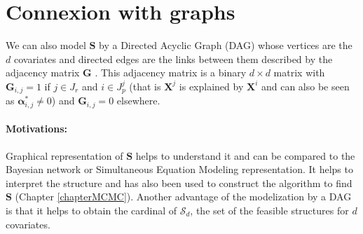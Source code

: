 \documentclass[12pt,a4paper]{report}
\begin{document}
\section{Connexion with graphs}\label{sectiongraph}
	We can also model $\boldsymbol{S}$ by a Directed Acyclic Graph (DAG) whose vertices are the $d$ covariates and directed edges are the links  between them described by the adjacency matrix $\boldsymbol{G}$ \cite{bondy1976graph}. This adjacency matrix is a binary $d\times d$ matrix with $\boldsymbol{G}_{i,j}=1$ if $j\in J_r$ and $i \in J_p^j$ (that is $\boldsymbol{X}^j$ is explained by $\boldsymbol{X}^i$ and can also be seen as $\boldsymbol{\alpha}^*_{i,j}\neq 0$) and $\boldsymbol{G}_{i,j}=0$ elsewhere.\\
	
\paragraph{Motivations:} Graphical representation of $\boldsymbol{S}$ helps to understand it and can be compared to the Bayesian network or Simultaneous Equation Modeling representation. It helps to interpret the structure and has also been used to construct the algorithm to find $\boldsymbol{S}$ (Chapter \ref{chapterMCMC}). Another advantage of the modelization by a DAG is that it helps to obtain the cardinal of $\mathcal{S}_d$, the set of the feasible structures for $d$ covariates.\\
	
\end{document}
